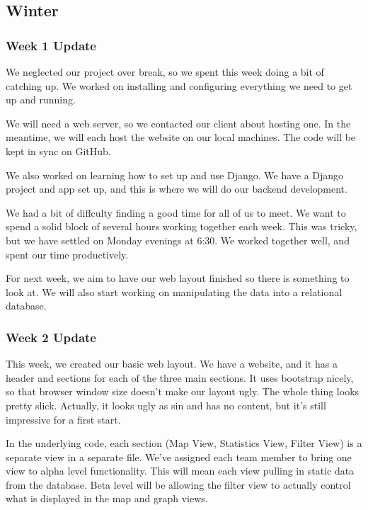 \subsection{Winter}

\subsubsection{Week 1 Update}
We neglected our project over break, so we spent this week doing a bit of catching up.
We worked on installing and configuring everything we need to get up and running.

We will need a web server, so we contacted our client about hosting one.
In the meantime, we will each host the website on our local machines.
The code will be kept in sync on GitHub.

We also worked on learning how to set up and use Django.
We have a Django project and app set up, and this is where we will do our backend development.

We had a bit of diffculty finding a good time for all of us to meet.
We want to spend a solid block of several hours working together each week.
This was tricky, but we have settled on Monday evenings at 6:30.
We worked together well, and spent our time productively.

For next week, we aim to have our web layout finished so there is something to look at.
We will also start working on manipulating the data into a relational database.

\subsubsection{Week 2 Update}
This week, we created our basic web layout.
We have a website, and it has a header and sections for each of the three main sections.
It uses bootstrap nicely, so that browser window size doesn't make our layout ugly.
The whole thing looks pretty slick.
Actually, it looks ugly as sin and has no content, but it's still impressive for a first start.

In the underlying code, each ​section (Map View, Statistics View, Filter View) is a separate view in a separate file.
We've assigned each team member to bring one view to alpha level functionality.
This will mean each view pulling in static data from the database.
Beta level will be allowing the filter view to actually control what is displayed in the map and graph views.


